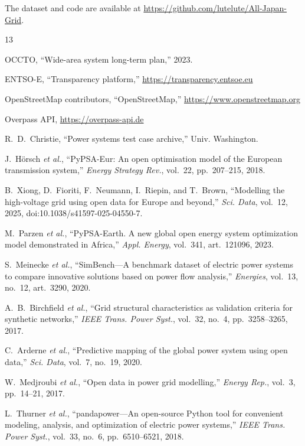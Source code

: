 \documentclass[journal]{IEEEtran}
\begin{document}
The dataset and code are available at \url{https://github.com/lutelute/All-Japan-Grid}.

\begin{thebibliography}{13}

OCCTO, ``Wide-area system long-term plan,'' 2023.

ENTSO-E, ``Transparency platform,'' \url{https://transparency.entsoe.eu}

OpenStreetMap contributors, ``OpenStreetMap,'' \url{https://www.openstreetmap.org}

Overpass API, \url{https://overpass-api.de}

R.~D.~Christie, ``Power systems test case archive,'' Univ. Washington.

J.~H\"{o}rsch \textit{et al.}, ``PyPSA-Eur: An open optimisation model of the European transmission system,'' \textit{Energy Strategy Rev.}, vol.~22, pp.~207--215, 2018.

B.~Xiong, D.~Fioriti, F.~Neumann, I.~Riepin, and T.~Brown, ``Modelling the high-voltage grid using open data for Europe and beyond,'' \textit{Sci. Data}, vol.~12, 2025, doi:10.1038/s41597-025-04550-7.

M.~Parzen \textit{et al.}, ``PyPSA-Earth. A new global open energy system optimization model demonstrated in Africa,'' \textit{Appl. Energy}, vol.~341, art.~121096, 2023.

S.~Meinecke \textit{et al.}, ``SimBench---A benchmark dataset of electric power systems to compare innovative solutions based on power flow analysis,'' \textit{Energies}, vol.~13, no.~12, art.~3290, 2020.

A.~B.~Birchfield \textit{et al.}, ``Grid structural characteristics as validation criteria for synthetic networks,'' \textit{IEEE Trans. Power Syst.}, vol.~32, no.~4, pp.~3258--3265, 2017.

C.~Arderne \textit{et al.}, ``Predictive mapping of the global power system using open data,'' \textit{Sci. Data}, vol.~7, no.~19, 2020.

W.~Medjroubi \textit{et al.}, ``Open data in power grid modelling,'' \textit{Energy Rep.}, vol.~3, pp.~14--21, 2017.

L.~Thurner \textit{et al.}, ``pandapower---An open-source Python tool for convenient modeling, analysis, and optimization of electric power systems,'' \textit{IEEE Trans. Power Syst.}, vol.~33, no.~6, pp.~6510--6521, 2018.


\end{thebibliography}
\end{document}
